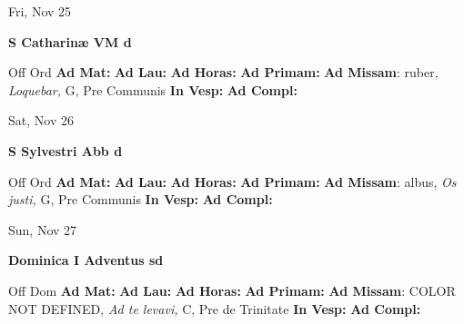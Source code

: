 \documentclass[10pt]{memoir}
\begin{document}
\begin{center}
\begin{minipage}{3.5in}
\vspace{2em}
\begin{center}Fri, Nov 25
\end{center}
\textbf{ \large S Catharinæ VM
\textnormal{\normalsize d}}

\begin{justify}Off Ord
\textbf{Ad Mat: }
\textbf{Ad Lau: }
\textbf{Ad Horas: }
\textbf{Ad Primam: }\textbf{Ad Missam}: ruber, \textit{Loquebar,} G, Pre Communis
\textbf{In Vesp: }
\textbf{Ad Compl: }
\end{justify}
\end{minipage}
\end{center}

\begin{center}
\begin{minipage}{3.5in}
\vspace{2em}
\begin{center}Sat, Nov 26
\end{center}
\textbf{ \large S Sylvestri Abb
\textnormal{\normalsize d}}

\begin{justify}Off Ord
\textbf{Ad Mat: }
\textbf{Ad Lau: }
\textbf{Ad Horas: }
\textbf{Ad Primam: }\textbf{Ad Missam}: albus, \textit{Os justi,} G, Pre Communis
\textbf{In Vesp: }
\textbf{Ad Compl: }
\end{justify}
\end{minipage}
\end{center}

\begin{center}
\begin{minipage}{3.5in}
\vspace{2em}
\begin{center}Sun, Nov 27
\end{center}
\textbf{ \large Dominica I Adventus
\textnormal{\normalsize sd}}

\begin{justify}Off Dom
\textbf{Ad Mat: }
\textbf{Ad Lau: }
\textbf{Ad Horas: }
\textbf{Ad Primam: }\textbf{Ad Missam}: COLOR NOT DEFINED, \textit{Ad te levavi,} C, Pre de Trinitate
\textbf{In Vesp: }
\textbf{Ad Compl: }
\end{justify}
\end{minipage}
\end{center}
\end{document}

